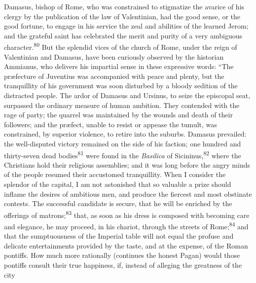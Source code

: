 
Damasus, bishop of Rome, who was constrained to stigmatize the
avarice of his clergy by the publication of the law of
Valentinian, had the good sense, or the good fortune, to engage
in his service the zeal and abilities of the learned Jerom; and
the grateful saint has celebrated the merit and purity of a very
ambiguous character.\textsuperscript{80} But the splendid vices of the church of
Rome, under the reign of Valentinian and Damasus, have been
curiously observed by the historian Ammianus, who delivers his
impartial sense in these expressive words: “The præfecture of
Juventius was accompanied with peace and plenty, but the
tranquillity of his government was soon disturbed by a bloody
sedition of the distracted people. The ardor of Damasus and
Ursinus, to seize the episcopal seat, surpassed the ordinary
measure of human ambition. They contended with the rage of party;
the quarrel was maintained by the wounds and death of their
followers; and the præfect, unable to resist or appease the
tumult, was constrained, by superior violence, to retire into the
suburbs. Damasus prevailed: the well-disputed victory remained on
the side of his faction; one hundred and thirty-seven dead bodies\textsuperscript{81}
were found in the \textit{Basilica} of Sicininus,\textsuperscript{82} where the
Christians hold their religious assemblies; and it was long
before the angry minds of the people resumed their accustomed
tranquillity. When I consider the splendor of the capital, I am
not astonished that so valuable a prize should inflame the
desires of ambitious men, and produce the fiercest and most
obstinate contests. The successful candidate is secure, that he
will be enriched by the offerings of matrons;\textsuperscript{83} that, as soon as
his dress is composed with becoming care and elegance, he may
proceed, in his chariot, through the streets of Rome;\textsuperscript{84} and that
the sumptuousness of the Imperial table will not equal the
profuse and delicate entertainments provided by the taste, and at
the expense, of the Roman pontiffs. How much more rationally
(continues the honest Pagan) would those pontiffs consult their
true happiness, if, instead of alleging the greatness of the city
